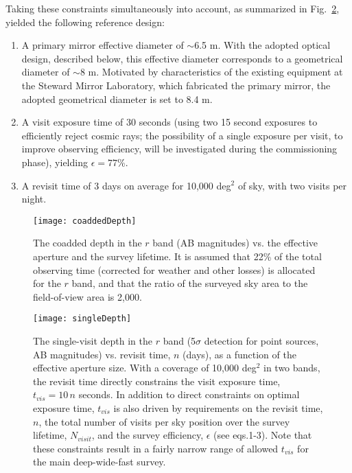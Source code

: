 Taking these constraints simultaneously into account, as summarized in
Fig.~\ref{Fig:singleDepth},
yielded the following reference design:
\begin{enumerate}
\item A primary mirror effective diameter of $\sim$6.5 m. With the adopted optical
design, described below, this effective diameter corresponds to a geometrical diameter
of $\sim$8 m. Motivated by characteristics of the existing equipment at the
Steward Mirror Laboratory, which fabricated the primary mirror, the adopted
geometrical diameter is set to 8.4 m.
\item A visit exposure time of 30 seconds (using two 15 second exposures
to efficiently reject cosmic rays; the possibility of a single exposure per visit,
to improve observing efficiency, will be investigated during the commissioning phase),
yielding $\epsilon=77$\%.
\item A revisit time of 3 days on average for 10,000 deg$^2$ of sky,
  with two visits per night.
\end{enumerate}

\begin{figure}[t]
\texttt{[image: coaddedDepth]}
\caption{The coadded depth in the $r$ band (AB magnitudes) vs. the effective aperture and
the survey lifetime. It is assumed that 22\% of the total observing time (corrected for
weather and other losses) is allocated for the $r$ band, and that the ratio of
the surveyed sky area to the field-of-view area is 2,000.}
\label{Fig:coaddDepth}
\end{figure}

\begin{figure}[t]
\texttt{[image: singleDepth]}
\caption{The single-visit depth in the $r$ band (5$\sigma$ detection for
point sources, AB magnitudes) vs. revisit time, $n$ (days), as a function of
the effective aperture size. With a coverage of 10,000 deg$^2$ in two bands,
the revisit time directly constrains the visit exposure time, $t_{vis}=10\,n$
seconds. In addition to direct constraints on optimal exposure time, $t_{vis}$
is also driven by requirements on the revisit time, $n$, the total number of visits
per sky position over the survey lifetime, $N_{visit}$, and the survey efficiency,
$\epsilon$ (see eqs.1-3). Note that these constraints result in a fairly narrow range of
allowed $t_{vis}$ for the main deep-wide-fast survey.}
\label{Fig:singleDepth}
\end{figure}

